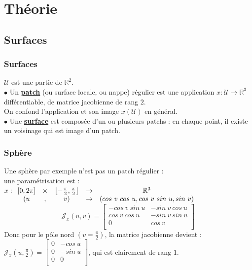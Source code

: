 \documentclass{beamer}
\newcommand{\gs}[1]{\textbf{\underline{#1}}}
\newcommand{\R}{\mathbb{R}}
\begin{document}
\section{Théorie}
\subsection{Surfaces}
\begin {frame}
\frametitle{Surfaces}
  $\mathscr{U}$ est une partie de $\R^2$.\\
  $\bullet$ Un \gs{patch} (ou surface locale, ou nappe) régulier est une application $x:\mathscr{U}\rightarrow \R^3$ différentiable, de matrice jacobienne de rang $2$.\\
  On confond l'application et son image $x(\mathscr{U})$ en général.\\
 \pause 
$\bullet$ Une \gs{surface} est composée d'un ou plusieurs patchs : en chaque point, il existe un voisinage qui est image d'un patch. 
\end {frame}

\begin {frame}
\frametitle{Sphère}
Une sphère par exemple n'est pas un patch régulier : \\ une paramétrisation est :\\
$x : \begin{array}[t]{ccccc}[0,2\pi] &\times& \left[-\frac{\pi}{2},\frac{\pi}{2}\right]&\rightarrow & \R^3\\
(u&,&v)&\rightarrow &(cos\ v\ cos\ u, cos\ v\ sin\ u, sin\ v)\\ \end{array}$\\
\pause
\vspace{1cm}
$$\mathscr{J}_x(u,v) = \left[\begin{array}{cc} 
-cos\ v\ sin\ u & -sin\ v\ cos\ u\\
cos\ v\ cos\ u & -sin\ v\ sin\ u \\ 
0 & cos\ v \\ \end{array}\right]$$
\pause
Donc pour le pôle nord $\left(v=\frac{\pi}{2}\right)$, la matrice jacobienne devient : \\
$\mathscr{J}_x\left(u,\frac{\pi}{2}\right) = \left[\begin{array}{cc} 
0 & -cos\ u\\
0 & -sin\ u \\ 
0 & 0 \\ \end{array}\right]$, qui est clairement de rang $1$.
\end {frame}
\end{document}
